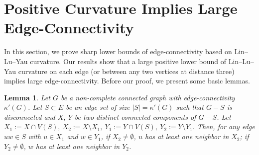 \documentclass[10pt,a4paper]{article}
\newtheorem{theorem}{Theorem}[section]
\newtheorem{lemma}{Lemma}[section]
\theoremstyle{definition}
\theoremstyle{definition}
\theoremstyle{nonumber}
\newtheorem*{theorem*}{Theorem}
\begin{document}



\section{Positive Curvature Implies Large Edge-Connectivity}\label{section}



In this section, we prove sharp lower bounds of edge-connectivity based on Lin--Lu--Yau curvature. Our results show that a large positive lower bound of Lin--Lu--Yau curvature on each edge (or between any two vertices at distance three) implies large edge-connectivity. Before our proof, we present some basic lemmas.

\begin{lemma} \label{neighbor}
Let $G$ be a non-complete connected graph with edge-connectivity $\kappa'(G)$. Let $S \subset E$ be an edge set of size $|S| = \kappa'(G)$ such that $G - S$ is disconnected and $X$, $Y$ be two distinct connected components of $G - S$. Let $X_1:=X\cap V(S),\ X_2:=X \setminus X_1,\ Y_1:=Y\cap V(S),\ Y_2:=Y \setminus Y_1$. Then, for any edge $uw \in S$ with $u\in X_1$ and $w\in Y_1$, if $X_2\ne \emptyset$, $u$ has at least one neighbor in $X_2$; if $Y_2\ne \emptyset$, $w$ has at least one neighbor in $Y_2$.
\end{lemma}
\end{document}
